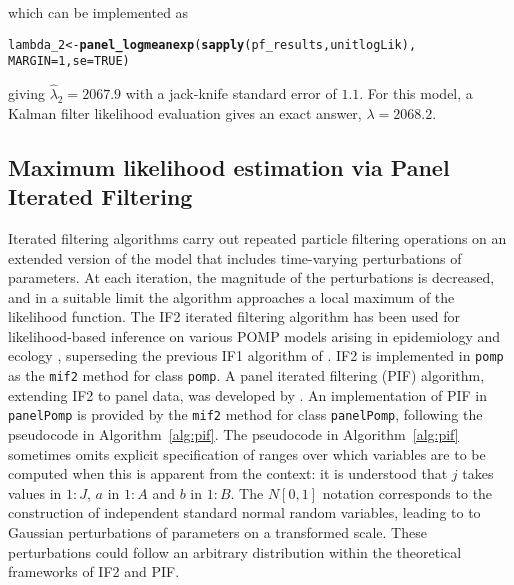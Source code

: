 \documentclass[12pt]{article}\usepackage[]{graphicx}\usepackage[table]{xcolor}
\makeatletter
\newcommand{\hlnum}[1]{\textcolor[rgb]{0.686,0.059,0.569}{#1}}%
\newcommand{\hldef}[1]{\textcolor[rgb]{0.345,0.345,0.345}{#1}}%
\newcommand{\hlkwb}[1]{\textcolor[rgb]{0.69,0.353,0.396}{#1}}%
\newcommand{\hlkwc}[1]{\textcolor[rgb]{0.333,0.667,0.333}{#1}}%
\newcommand{\hlkwd}[1]{\textcolor[rgb]{0.737,0.353,0.396}{\textbf{#1}}}%
\newenvironment{kframe}{%
 \def\at@end@of@kframe{}%
 \ifinner\ifhmode%
  \def\at@end@of@kframe{\end{minipage}}%
  \begin{minipage}{\columnwidth}%
 \fi\fi%
 \def\FrameCommand##1{\hskip\@totalleftmargin \hskip-\fboxsep
 \colorbox{shadecolor}{##1}\hskip-\fboxsep
     \hskip-\linewidth \hskip-\@totalleftmargin \hskip\columnwidth}%
 \MakeFramed {\advance\hsize-\width
   \@totalleftmargin\z@ \linewidth\hsize
   \@setminipage}}%
 {\par\unskip\endMakeFramed%
 \at@end@of@kframe}
\newenvironment{knitrout}{}{} %
\newcommand\code{\texttt}
\newcommand\panelPomp{\texttt{panelPomp}\xspace}
\newcommand\pomp{\texttt{pomp}\xspace}
\newcommand\np{j}
\newcommand\Np{J}   %
\newcommand\Nshared{A}
\newcommand\nshared{a}
\newcommand\Nspecific{B}
\newcommand\nspecific{b}
\newcommand\loglik{\lambda}
\newcommand\seq[2]{{#1}\!:\!{#2}}
\makeatother
\begin{document}
which can be implemented as
\begin{knitrout}
\color{fgcolor}\begin{kframe}
\begin{alltt}
\hldef{lambda_2} \hlkwb{<-} \hlkwd{panel_logmeanexp}\hldef{(}\hlkwd{sapply}\hldef{(pf_results,unitlogLik),}
  \hlkwc{MARGIN}\hldef{=}\hlnum{1}\hldef{,}\hlkwc{se}\hldef{=}\hlnum{TRUE}\hldef{)}
\end{alltt}
\end{kframe}
\end{knitrout}
giving $\hat\loglik_2=2067.9$ with a jack-knife standard error of $1.1$.
For this model, a Kalman filter likelihood evaluation gives an exact answer, $\loglik=2068.2$.

\subsection{Maximum likelihood estimation via Panel Iterated Filtering} \label{sec:pif}

Iterated filtering algorithms carry out repeated particle filtering operations on an extended version of the model that includes time-varying perturbations of parameters.
At each iteration, the magnitude of the perturbations is decreased, and in a suitable limit the algorithm approaches a local maximum of the likelihood function.
The IF2 iterated filtering algorithm \citep{ionides15} has been used for likelihood-based inference on various POMP models arising in epidemiology and ecology \citep[reviewed by][]{breto18}, superseding the previous IF1 algorithm of \citet{ionides06}.
IF2 is implemented in \pomp as the \code{mif2} method for class \code{pomp}.
A panel iterated filtering (PIF) algorithm, extending IF2 to panel data, was developed by \citet{breto19}.
An implementation of PIF in \panelPomp is provided by the \code{mif2} method for class \code{panelPomp}, following the pseudocode in Algorithm~\ref{alg:pif}.
The pseudocode in  Algorithm~\ref{alg:pif} sometimes omits explicit specification of ranges over which variables are to be computed when this is apparent from the context:
it is understood that $\np$ takes values in $\seq{1}{\Np}$, $\nshared$ in
$\seq{1}{\Nshared}$ and $\nspecific$ in $\seq{1}{\Nspecific}$.
The $N[0,1]$ notation corresponds to the construction of independent standard normal random variables, leading to to Gaussian perturbations of parameters on a transformed scale.
These perturbations could follow an arbitrary distribution within the theoretical frameworks of IF2 and PIF.
\end{document}
